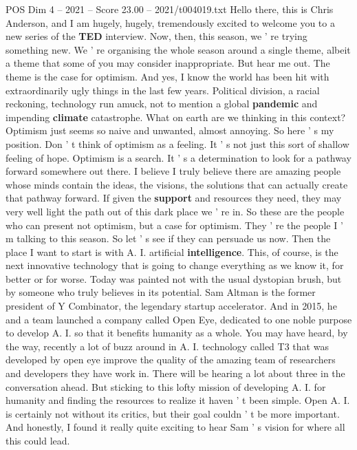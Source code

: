 \begin{textsample}{POS Dim 4 – 2021 – Score 23.00 – 2021/t004019.txt}  \label{ex:f4_pos_035}
Hello there, this is Chris Anderson, and I am hugely, hugely, tremendously excited to welcome you to a new series of the \textbf{TED} interview.
Now, then, this season, we ' re trying something new.
We ' re organising the whole season around a single theme, albeit a theme that some of you may consider inappropriate.
But hear me out.
The theme is the case for optimism.
And yes, I know the world has been hit with extraordinarily ugly things in the last few years.
Political division, a racial reckoning, technology run amuck, not to mention a global \textbf{pandemic} and impending \textbf{climate} catastrophe.
What on earth are we thinking in this context?
Optimism just seems so naive and unwanted, almost annoying.
So here ' s my position.
Don ' t think of optimism as a feeling.
It ' s not just this sort of shallow feeling of hope.
Optimism is a search.
It ' s a determination to look for a pathway forward somewhere out there.
I believe I truly believe there are amazing people whose minds contain the ideas, the visions, the solutions that can actually create that pathway forward.
If given the \textbf{support} and resources they need, they may very well light the path out of this dark place we ' re in.
So these are the people who can present not optimism, but a case for optimism.
They ' re the people I ' m talking to this season.
So let ' s see if they can persuade us now.
Then the place I want to start is with A.
I. artificial \textbf{intelligence}.
This, of course, is the next innovative technology that is going to change everything as we know it, for better or for worse.
Today was painted not with the usual dystopian brush, but by someone who truly believes in its potential.
Sam Altman is the former president of Y Combinator, the legendary startup accelerator.
And in 2015, he and a team launched a company called Open Eye, dedicated to one noble purpose to develop A.
I. so that it benefits humanity as a whole.
You may have heard, by the way, recently a lot of buzz around in A.
I. technology called T3 that was developed by open eye improve the quality of the amazing team of researchers and developers they have work in.
There will be hearing a lot about three in the conversation ahead.
But sticking to this lofty mission of developing A.
I. for humanity and finding the resources to realize it haven ' t been simple.
Open A.
I. is certainly not without its critics, but their goal couldn ' t be more important.
And honestly, I found it really quite exciting to hear Sam ' s vision for where all this could lead.

\end{textsample}
